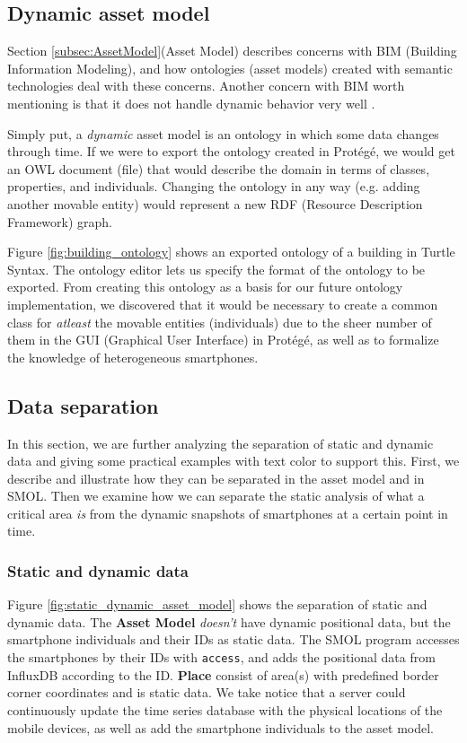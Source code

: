 \documentclass{article}
\begin{document}
\subsection{Dynamic asset model}\label{subsubsec:DynamicAssetModel}
Section \ref{subsec:AssetModel}(Asset Model) describes concerns with BIM (Building Information Modeling), and how ontologies (asset models) created with semantic technologies deal with these concerns. Another concern with BIM worth mentioning is that it does not handle dynamic behavior very well \cite{kamburjan_digital_2022}.

Simply put, a \emph{dynamic} asset model is an ontology in which some data changes through time. If we were to export the ontology created in Protégé, we would get an OWL document (file) that would describe the domain in terms of classes, properties, and individuals. Changing the ontology in any way (e.g. adding another movable entity) would represent a new RDF (Resource Description Framework) graph.

Figure \ref{fig:building_ontology} shows an exported ontology of a building in Turtle Syntax. The ontology editor lets us specify the format of the ontology to be exported. From creating this ontology as a basis for our future ontology implementation, we discovered that it would be necessary to create a common class for \emph{atleast} the movable entities (individuals) due to the sheer number of them in the GUI (Graphical User Interface) in Protégé, as well as to formalize the knowledge of heterogeneous smartphones.

\subsection{Data separation}
In this section, we are further analyzing the separation of static and dynamic data and giving some practical examples with text color to support this. First, we describe and illustrate how they can be separated in the asset model and in SMOL. Then we examine how we can separate the static analysis of what a critical area \emph{is} from the dynamic snapshots of smartphones at a certain point in time.

\subsubsection{Static and dynamic data}
Figure \ref{fig:static_dynamic_asset_model} shows the separation of static and dynamic data. The \textbf{Asset Model} \emph{doesn't} have dynamic positional data, but the smartphone individuals and their IDs as static data. The SMOL program accesses the smartphones by their IDs with \verb|access|, and adds the positional data from InfluxDB according to the ID. \textbf{Place} consist of area(s) with predefined border corner coordinates and is static data. We take notice that a server could continuously update the time series database with the physical locations of the mobile devices, as well as add the smartphone individuals to the asset model.
\end{document}
